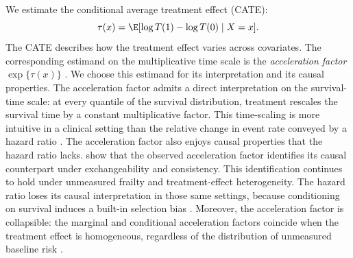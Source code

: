 We estimate the conditional average treatment effect (CATE):
\begin{equation}
\tau(x) = \E[\log T(1) - \log T(0) \mid X = x].
\label{eq:cate}
\end{equation}
The CATE describes how the treatment effect varies across covariates.
The corresponding estimand on the multiplicative time scale is the \emph{acceleration factor} $\exp\{\tau(x)\}$ \citep{pang2021flexible}.
We choose this estimand for its interpretation and its causal properties.
The acceleration factor admits a direct interpretation on the survival-time scale: at every quantile of the survival distribution, treatment rescales the survival time by a constant multiplicative factor.
This time-scaling is more intuitive in a clinical setting than the relative change in event rate conveyed by a hazard ratio \citep{Swindell2009}.
The acceleration factor also enjoys causal properties that the hazard ratio lacks.
\citet{Brathovde2024} show that the observed acceleration factor identifies its causal counterpart under exchangeability and consistency.
This identification continues to hold under unmeasured frailty and treatment-effect heterogeneity.
The hazard ratio loses its causal interpretation in those same settings, because conditioning on survival induces a built-in selection bias \citep{hernan2010}.
Moreover, the acceleration factor is collapsible: the marginal and conditional acceleration factors coincide when the treatment effect is homogeneous, regardless of the distribution of unmeasured baseline risk \citep{Crowther2023}.

